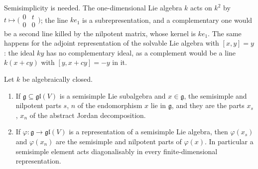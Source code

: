 \begin{counterexample}\label{representation-theory:counterexample-weyl}
Semisimplicity is needed. The one-dimensional Lie algebra $k$ acts on $k^2$ by $t \mapsto \bigl(\begin{smallmatrix}0 & t\\ 0 & 0\end{smallmatrix}\bigr)$; the line $ke_1$ is a
subrepresentation, and a complementary one would be a second line killed by the nilpotent matrix, whose kernel is $ke_1$. The same happens for the adjoint representation of the
solvable Lie algebra with $[x, y] = y$: the ideal $ky$ has no complementary ideal, as a complement would be a line $k(x + cy)$ with $[y, x + cy] = -y$ in it.
\end{counterexample}

\begin{corollary}\label{representation-theory:corollary-jordan-preserved}
Let $k$ be algebraically closed.
\begin{enumerate}
\item If $\mathfrak{g} \subseteq \mathfrak{gl}(V)$ is a semisimple Lie subalgebra and $x \in \mathfrak{g}$, the semisimple and nilpotent parts $s$, $n$ of the endomorphism $x$ lie in
$\mathfrak{g}$, and they are the parts $x_s$, $x_n$ of the abstract Jordan decomposition.
\item If $\varphi \colon \mathfrak{g} \to \mathfrak{gl}(V)$ is a representation of a semisimple Lie algebra, then $\varphi(x_s)$ and $\varphi(x_n)$ are the semisimple and nilpotent
parts of $\varphi(x)$. In particular a semisimple element acts diagonalisably in every finite-dimensional representation.
\end{enumerate}
\end{corollary}

